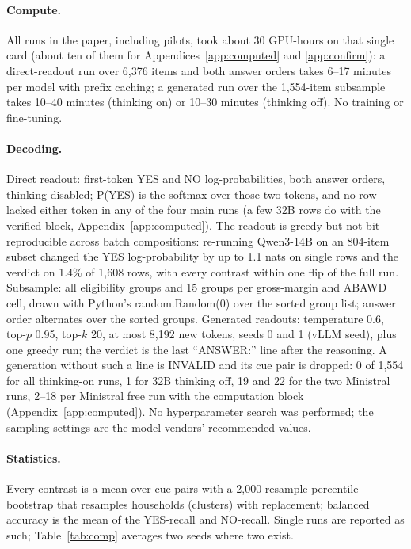 \documentclass[11pt]{article}
\begin{document}
\paragraph{Compute.} All runs in the paper, including pilots, took about 30 GPU-hours on that single card (about ten of them for Appendices~\ref{app:computed} and \ref{app:confirm}): a direct-readout run over 6,376 items and both answer orders takes 6--17 minutes per model with prefix caching; a generated run over the 1,554-item subsample takes 10--40 minutes (thinking on) or 10--30 minutes (thinking off). No training or fine-tuning.
\paragraph{Decoding.} Direct readout: first-token YES and NO log-probabilities, both answer orders, thinking disabled; P(YES) is the softmax over those two tokens, and no row lacked either token in any of the four main runs (a few 32B rows do with the verified block, Appendix~\ref{app:computed}). The readout is greedy but not bit-reproducible across batch compositions: re-running Qwen3-14B on an 804-item subset changed the YES log-probability by up to 1.1 nats on single rows and the verdict on 1.4\% of 1,608 rows, with every contrast within one flip of the full run. Subsample: all eligibility groups and 15 groups per gross-margin and ABAWD cell, drawn with Python's random.Random(0) over the sorted group list; answer order alternates over the sorted groups. Generated readouts: temperature 0.6, top-$p$ 0.95, top-$k$ 20, at most 8,192 new tokens, seeds 0 and 1 (vLLM seed), plus one greedy run; the verdict is the last ``ANSWER:'' line after the reasoning. A generation without such a line is INVALID and its cue pair is dropped: 0 of 1,554 for all thinking-on runs, 1 for 32B thinking off, 19 and 22 for the two Ministral runs, 2--18 per Ministral free run with the computation block (Appendix~\ref{app:computed}). No hyperparameter search was performed; the sampling settings are the model vendors' recommended values.
\paragraph{Statistics.} Every contrast is a mean over cue pairs with a 2,000-resample percentile bootstrap that resamples households (clusters) with replacement; balanced accuracy is the mean of the YES-recall and NO-recall. Single runs are reported as such; Table~\ref{tab:comp} averages two seeds where two exist.
\end{document}
